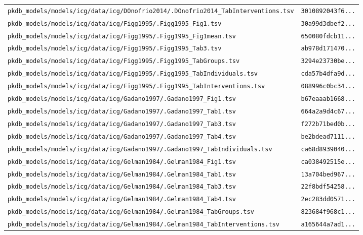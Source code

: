 \begin{longtable}{ll}
\texttt{pkdb\_models/models/icg/data/icg/DOnofrio2014/.DOnofrio2014\_TabInterventions.tsv} & \texttt{3010892043f6...} \\
\texttt{pkdb\_models/models/icg/data/icg/Figg1995/.Figg1995\_Fig1.tsv} & \texttt{30a99d3dbef2...} \\
\texttt{pkdb\_models/models/icg/data/icg/Figg1995/.Figg1995\_Fig1mean.tsv} & \texttt{650080fdcb11...} \\
\texttt{pkdb\_models/models/icg/data/icg/Figg1995/.Figg1995\_Tab3.tsv} & \texttt{ab978d171470...} \\
\texttt{pkdb\_models/models/icg/data/icg/Figg1995/.Figg1995\_TabGroups.tsv} & \texttt{3294e23730be...} \\
\texttt{pkdb\_models/models/icg/data/icg/Figg1995/.Figg1995\_TabIndividuals.tsv} & \texttt{cda57b4dfa9d...} \\
\texttt{pkdb\_models/models/icg/data/icg/Figg1995/.Figg1995\_TabInterventions.tsv} & \texttt{088996c0bc34...} \\
\texttt{pkdb\_models/models/icg/data/icg/Gadano1997/.Gadano1997\_Fig1.tsv} & \texttt{b67eaaab1668...} \\
\texttt{pkdb\_models/models/icg/data/icg/Gadano1997/.Gadano1997\_Tab1.tsv} & \texttt{664a2a9d4c67...} \\
\texttt{pkdb\_models/models/icg/data/icg/Gadano1997/.Gadano1997\_Tab3.tsv} & \texttt{f272b71bed0b...} \\
\texttt{pkdb\_models/models/icg/data/icg/Gadano1997/.Gadano1997\_Tab4.tsv} & \texttt{be2bdead7111...} \\
\texttt{pkdb\_models/models/icg/data/icg/Gadano1997/.Gadano1997\_TabIndividuals.tsv} & \texttt{ca68d8939040...} \\
\texttt{pkdb\_models/models/icg/data/icg/Gelman1984/.Gelman1984\_Fig1.tsv} & \texttt{ca038492515e...} \\
\texttt{pkdb\_models/models/icg/data/icg/Gelman1984/.Gelman1984\_Tab1.tsv} & \texttt{13a704bed967...} \\
\texttt{pkdb\_models/models/icg/data/icg/Gelman1984/.Gelman1984\_Tab3.tsv} & \texttt{22f8bdf54258...} \\
\texttt{pkdb\_models/models/icg/data/icg/Gelman1984/.Gelman1984\_Tab4.tsv} & \texttt{2ec283dd0571...} \\
\texttt{pkdb\_models/models/icg/data/icg/Gelman1984/.Gelman1984\_TabGroups.tsv} & \texttt{823684f968c1...} \\
\texttt{pkdb\_models/models/icg/data/icg/Gelman1984/.Gelman1984\_TabInterventions.tsv} & \texttt{a165644a7ad1...} \\

\end{longtable}
